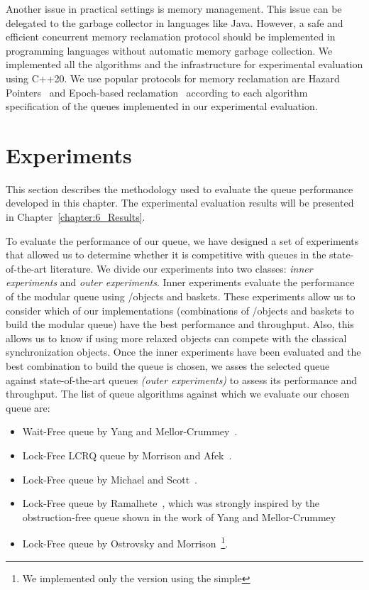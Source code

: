 Another issue in practical settings is memory management. This issue can be delegated to the garbage collector in languages like Java. However, a safe and efficient concurrent memory reclamation protocol should be implemented in programming languages without automatic memory garbage collection. We implemented all the algorithms and the infrastructure for experimental evaluation using C++20. We use popular protocols for memory reclamation are Hazard Pointers~\cite{DBLP_conf_podc_Michael02} and Epoch-based reclamation~\cite{DBLP_phd_ethos_Fraser04,mckenney2001read} according to each algorithm specification of the queues implemented in our experimental evaluation.




\section{\label{sec:queue-experiments}Experiments}

This section describes the methodology used to evaluate the queue performance developed in this chapter. The experimental evaluation results will be presented in Chapter~\ref{chapter:6_Results}.

To evaluate the performance of our queue, we have designed a set of experiments that allowed us to determine whether it is competitive with queues in the state-of-the-art literature.
We divide our experiments into two classes: \emph{inner experiments} and \emph{outer experiments}.
Inner experiments evaluate the performance of the modular queue using \LL/\IC objects and baskets. These experiments allow us to consider which of our implementations (combinations of \LL/\IC objects and baskets to build the modular queue) have the best performance and throughput. Also, this allows us to know if using more relaxed objects can compete with the classical synchronization objects. Once the inner experiments have been evaluated and the best combination to build the queue is chosen, we asses the selected queue against state-of-the-art queues \emph{(outer experiments)} to assess its performance and throughput. The list of queue 
algorithms against which we evaluate our chosen queue are:

\begin{itemize}
    \item Wait-Free queue by Yang and Mellor-Crummey~\cite{DBLP_conf_ppopp_YangM16}.
    \item Lock-Free LCRQ queue by Morrison and Afek~\cite{ppopp2013x86queues}.
    \item Lock-Free queue by Michael and Scott~\cite{DBLP_conf_podc_MichaelS96}.
    \item Lock-Free queue by Ramalhete~\cite{Ramalhete_Correia_MPMC_2016}, which was strongly inspired by the obstruction\hyp{}free queue shown in the work of Yang and Mellor-Crummey~\cite{DBLP_conf_ppopp_YangM16}
    \item Lock-Free queue by Ostrovsky and Morrison~\cite{scalingconcurrent2020}\footnote{We implemented only the version using the simple \CAS}.
\end{itemize}

